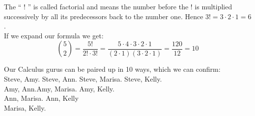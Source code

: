 \documentclass{article}
\begin{document}
The `` ! '' is called factorial and means the number before the ! is multiplied successively by all its predecessors back to the number one. Hence $3! = 3 \cdot 2 \cdot 1 = 6$.
\\ If we expand our formula we get:
\vspace{3 mm}
\[
 \binom{5}{2}=\frac{5!}{2! \cdot 3!} =\frac{5 \cdot 4 \cdot 3 \cdot 2 \cdot 1}{(2 \cdot 1)(3 \cdot 2 \cdot 1)}=\frac {120}{12} = 10
\]
\vspace{5 mm}
\begin{center} Our Calculus gurus can be paired up in 10 ways, which we can confirm:\\

\vspace{5 mm}
 \quad Steve, Amy. \quad Steve, Ann. \quad Steve, Marisa. \quad Steve, Kelly.\\ 
\vspace{2 mm}
\quad Amy, Ann.\quad Amy, Marisa. \quad Amy, Kelly.\\
\vspace{2 mm}
\quad  Ann, Marisa. \quad Ann, Kelly \\
\vspace{2 mm}
 \quad  Marisa, Kelly.\\ 
  
 \end{center}
 
 \pagebreak
\end{document}
